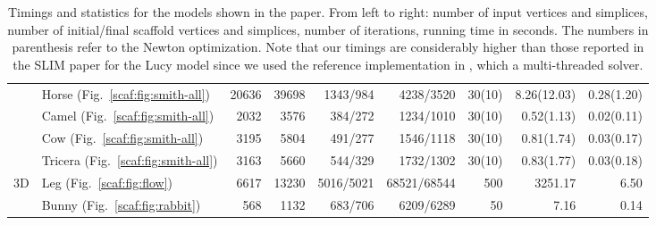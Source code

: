 \begin{table}[t]
\begin{adjustbox}{width=\columnwidth,totalheight=\textheight,keepaspectratio}
\begin{tabular}{llrrrrrrr}
&Horse (Fig.~\ref{scaf:fig:smith-all}) & 20636 & 39698 & 1343/984 & 4238/3520 & 30(10) & 8.26(12.03) & 0.28(1.20) \\
&Camel (Fig.~\ref{scaf:fig:smith-all}) & 2032 & 3576 & 384/272 & 1234/1010 & 30(10) & 0.52(1.13) & 0.02(0.11) \\
&Cow (Fig.~\ref{scaf:fig:smith-all}) & 3195 & 5804 & 491/277 & 1546/1118 & 30(10) & 0.81(1.74) & 0.03(0.17) \\
&Tricera (Fig.~\ref{scaf:fig:smith-all}) & 3163 & 5660 & 544/329 & 1732/1302 & 30(10) & 0.83(1.77) & 0.03(0.18) \\
\hline

\multirow{2}{*}{3D}&Leg (Fig.~\ref{scaf:fig:flow})
&6617&13230&5016/5021&68521/68544&500&3251.17&6.50\\
&Bunny (Fig.~\ref{scaf:fig:rabbit})
&568&1132&683/706&6209/6289&50&7.16&0.14\\

\hline
	\end{tabular}
	\end{adjustbox}
			\caption{Timings and statistics for the models shown in the paper. From left to right: number of input vertices and simplices, number of initial/final scaffold vertices and simplices, number of iterations, running time in seconds. The numbers in parenthesis refer to the Newton optimization. Note that our timings are considerably higher than those reported in the SLIM paper for the Lucy model since we used the reference implementation in \protect\cite{libigl}, which  a multi-threaded solver.}
	\label{tab:timings}
	\vspace{-0.2cm}
\end{table}
